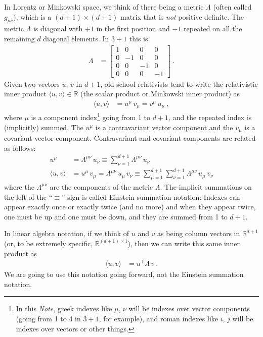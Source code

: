 \documentclass{article}
\newcommand{\inner}[2]{\langle{#1},{#2}\rangle}
\newcommand{\documentname}{\textsl{Note}}
\begin{document}
In Lorentz or Minkowski space, we think of there being a metric $\Lambda$ (often called $g_{\mu\nu}$), which is a $(d+1)\times(d+1)$ matrix that is \emph{not} positive definite.
The metric $\Lambda$ is diagonal with $+1$ in the first position and $-1$ repeated on all the remaining $d$ diagonal elements.
In $3+1$ this is
\begin{align}
    \Lambda &= \begin{bmatrix}1 & 0 & 0 & 0\\
                              0 & -1 & 0 & 0\\
                              0 & 0 & -1 & 0\\
                              0 & 0 & 0 & -1\end{bmatrix} ~.
\end{align}
Given two vectors $u$, $v$ in $d+1$, old-school relativists tend to write the relativistic inner product $\inner{u}{v}\in\mathbb{R}$ (the scalar product or Minkowski inner product) as
\begin{align}
    \inner{u}{v} &= u^\mu\,v_\mu = v^\mu\,u_\mu ~,
\end{align}
where $\mu$ is a component index\footnote{In this \documentname{}, greek indexes like $\mu$, $\nu$ will be indexes over vector components (going from 1 to 4 in $3+1$, for example), and roman indexes like $i$, $j$ will be indexes over vectors or other things.} going from 1 to $d+1$, and the repeated index is (implicitly) summed.
The $u^\mu$ is a contravariant vector component and the $v_\mu$ is a covariant vector component.
Contravariant and covariant components are related as follows:
\begin{align}
    u^\mu &= \Lambda^{\mu\nu}\,u_\nu \equiv \sum_{\nu=1}^{d+1} \Lambda^{\mu\nu}\,u_\nu
    \\
    \inner{u}{v} &= u^\mu\,v_\mu = \Lambda^{\mu\nu}\,u_\mu\,v_\nu \equiv \sum_{\mu=1}^{d+1}\sum_{\nu=1}^{d+1} \Lambda^{\mu\nu}\,u_\mu\,v_\nu
\end{align}
where the $\Lambda^{\mu\nu}$ are the components of the metric $\Lambda$.
The implicit summations on the left of the ``$\equiv$'' sign is called Einstein summation notation: Indexes can appear exactly once or exactly twice (and no more) and when they appear twice, one must be up and one must be down, and they are summed from 1 to $d+1$.

In linear algebra notation, if we think of $u$ and $v$ as being column vectors in $\mathbb{R}^{d+1}$ (or, to be extremely specific, $\mathbb{R}^{(d+1)\times 1}$), then we can write this same inner product as
\begin{align}
    \inner{u}{v} &= u^\top\Lambda\,v ~.
\end{align}
We are going to use this notation going forward, not the Einstein summation notation.
\end{document}
